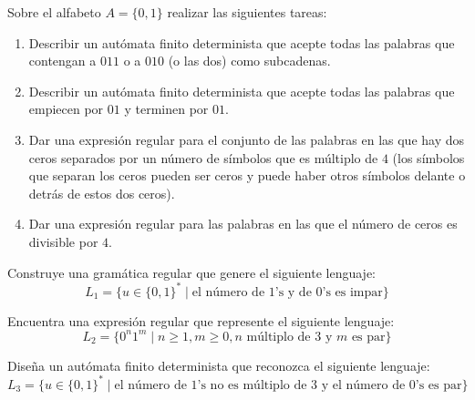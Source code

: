 \begin{ejercicio}
Sobre el alfabeto $A = \{0, 1\}$ realizar las siguientes tareas:
\begin{enumerate}
    \item Describir un autómata finito determinista que acepte todas las palabras que contengan a $011$ o a $010$ (o las dos) como subcadenas.
    \item Describir un autómata finito determinista que acepte todas las palabras que empiecen por $01$ y terminen por $01$.
    \item Dar una expresión regular para el conjunto de las palabras en las que hay dos ceros separados por un número de símbolos que es múltiplo de $4$ (los símbolos que separan los ceros pueden ser ceros y puede haber otros símbolos delante o detrás de estos dos ceros).
    \item Dar una expresión regular para las palabras en las que el número de ceros es divisible por $4$.
\end{enumerate}
\end{ejercicio}

\begin{ejercicio}
Construye una gramática regular que genere el siguiente lenguaje:
$$L_1 = \{u \in \{0, 1\}^* \mid \text{el número de 1's y de 0's es impar}\}$$
\end{ejercicio}

\begin{ejercicio}
Encuentra una expresión regular que represente el siguiente lenguaje:
$$L_2 = \{0^n1^m \mid n \geq 1, m \geq 0, n \text{ múltiplo de } 3 \text{ y } m \text{ es par}\}$$
\end{ejercicio}

\begin{ejercicio}
Diseña un autómata finito determinista que reconozca el siguiente lenguaje:
$$L_3 = \{u \in \{0, 1\}^* \mid \text{el número de 1's no es múltiplo de } 3 \text{ y el número de 0's es par}\}$$
\end{ejercicio}

